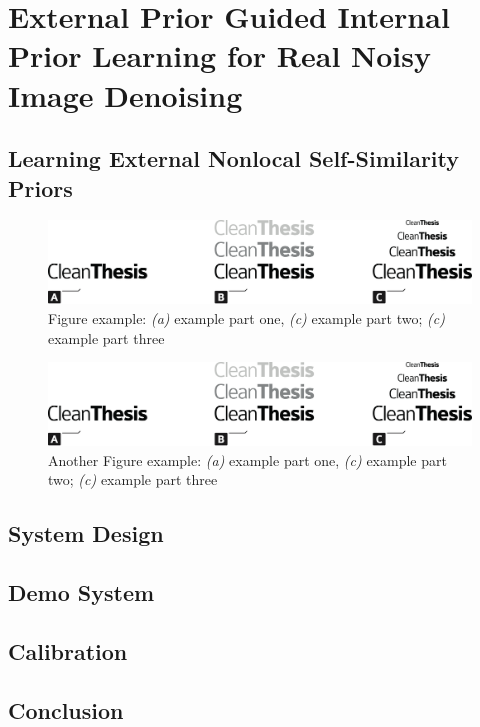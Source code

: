 %
\chapter{External Prior Guided Internal Prior Learning for Real Noisy Image Denoising}
\label{sec:guided}




\section{Learning External Nonlocal Self-Similarity Priors}
\label{sec:system:intro}

\begin{figure}[htb]
	\includegraphics[width=\textwidth]{gfx/Clean-Thesis-Figure}
	\caption{Figure example: \textit{(a)} example part one, \textit{(c)} example part two; \textit{(c)} example part three}
	\label{fig:system:example1}
\end{figure}

\blindtext

\blindtext

\begin{figure}[htb]
	\includegraphics[width=\textwidth]{gfx/Clean-Thesis-Figure}
	\caption{Another Figure example: \textit{(a)} example part one, \textit{(c)} example part two; \textit{(c)} example part three}
	\label{fig:system:example2}
\end{figure}

\blindtext

\section{System Design}
\label{sec:system:design}

\blindtext

\section{Demo System}
\label{sec:system:Demo}

\blindtext

\section{Calibration}
\label{sec:system:calibration}

\blindtext

\section{Conclusion}
\label{sec:system:conclusion}

\blindtext
